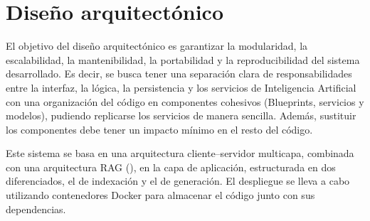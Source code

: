 \section{Diseño arquitectónico} \label{dis:arc}
El objetivo del diseño arquitectónico es garantizar la modularidad, la escalabilidad, la mantenibilidad, la portabilidad y la reproducibilidad del sistema desarrollado. Es decir, se busca tener una separación clara de responsabilidades entre la interfaz, la lógica, la persistencia y los servicios de Inteligencia Artificial con una organización del código en componentes cohesivos (Blueprints, servicios y modelos), pudiendo replicarse los servicios de manera sencilla. Además, sustituir los componentes debe tener un impacto mínimo en el resto del código. 

Este sistema se basa en una arquitectura cliente–servidor multicapa, combinada con una arquitectura RAG (), en la capa de aplicación, estructurada en dos  diferenciados, el de indexación y el de generación. El despliegue se lleva a cabo utilizando contenedores Docker para almacenar el código junto con sus dependencias.

